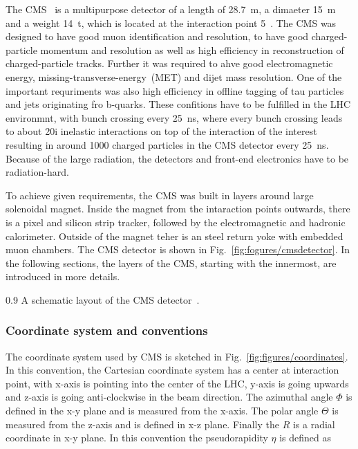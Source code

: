 The CMS~\cite{Chatrchyan:2008aa, CMSproposal} is a multipurpose detector of a length of 28.7~m, a dimaeter 15~m and a weight 14~t,  which is located at the interaction point 5~\cite{Chatrchyan:2008aa}. The CMS was designed to have good muon identification and resolution, to have good charged-particle momentum and resolution as well as high efficiency in reconstruction of charged-particle tracks. Further it was required to ahve good electromagnetic energy, missing-transverse-energy~(MET) and dijet mass resolution. One of the important requriments was also high efficiency in offline tagging of tau particles and jets originating fro b-quarks. These confitions have to be fulfilled in the LHC environmnt, with bunch crossing every 25~ns, where every bunch crossing leads to about 20i inelastic interactions on top of the interaction of the interest resulting in around 1000 charged particles in the CMS detector every 25~ns. Because of the large radiation, the detectors and front-end electronics have to be radiation-hard.

To achieve given requirements, the CMS was built in layers around large solenoidal magnet. Inside the magnet from the intaraction points outwards, there is a pixel and silicon strip tracker, followed by the electromagnetic and hadronic calorimeter. Outside of the magnet teher is an steel return yoke with embedded muon chambers. The CMS detector is shown in Fig.~\ref{fig:fogures/cmsdetector}. In  the following sections, the layers of the CMS, starting with the innermost, are introduced in more details.


                 {0.9}       %
                 { A schematic layout of the CMS detector~\cite{website:CMSdet}. }

\subsubsection{Coordinate system and conventions}


The coordinate system used by CMS is sketched in Fig.~\ref{fig:figures/coordinates}. In this convention, the Cartesian coordinate system has a center at interaction point, with x-axis is pointing into the center of the LHC, y-axis is going upwards and z-axis is going anti-clockwise in the beam direction. The azimuthal angle $\Phi$ is defined in the x-y plane and is measured from the x-axis. The polar angle $\Theta$ is measured from the z-axis and is defined in x-z plane. Finally the $R$ is a radial coordinate in x-y plane. In this convention the pseudorapidity $\eta$ is defined as

